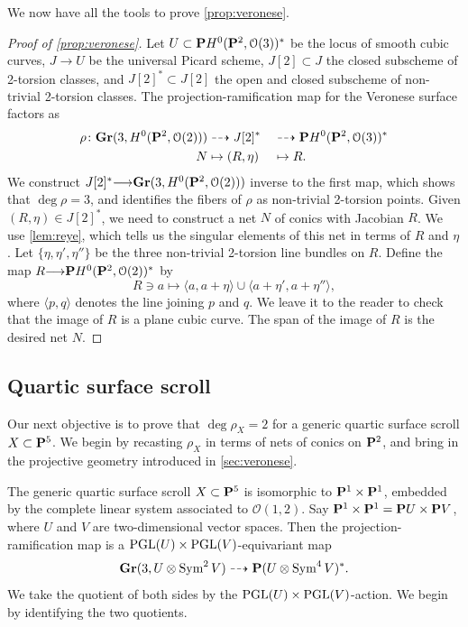 \documentclass[11pt,reqno]{amsart}
\theoremstyle{plain}
\theoremstyle{definition}
\theoremstyle{remark}
\numberwithin{equation}{section}
\renewcommand{\to}{{\longrightarrow}}
\numberwithin{equation}{section}
\renewcommand{\O}{\mathcal O}
\begin{document}
We now have all the tools to prove \autoref{prop:veronese}.
\begin{proof}[Proof of \autoref{prop:veronese}]
  Let $U \subset \P H^0(\P^2, \O(3))^*$ be the locus of smooth cubic curves, $J \to U$ be the universal Picard scheme, $J[2] \subset J$ the closed subscheme of 2-torsion classes, and $J[2]^* \subset J[2]$ the open and closed subscheme of non-trivial 2-torsion classes.
  The projection-ramification map for the Veronese surface factors as
  \begin{alignat*}{2}
    \rho \from \Gr(3, H^0(\P^2, \O(2))) &\dashrightarrow J[2]^* &&\dashrightarrow \P H^0(\P^2, \O(3))^*\\
    N &\mapsto (R, \eta) &&\mapsto R.
  \end{alignat*}
  We construct $J[2]^* \to \Gr(3,H^0(\P^2, \O(2)))$ inverse to the first map, which shows that $\deg \rho = 3$, and identifies the fibers of $\rho$ as non-trivial 2-torsion points.
  Given $(R, \eta) \in J[2]^*$, we need to construct a net $N$ of conics with Jacobian $R$.
  We use \autoref{lem:reye}, which tells us the singular elements of this net in terms of $R$ and $\eta$.
  Let $\{\eta, \eta', \eta''\}$ be the three non-trivial 2-torsion line bundles on $R$.
  Define the map $R \to \P H^0(\P^2, \O(2))^*$ by
  \[ R \ni a \mapsto \langle {a, a+\eta} \rangle \cup \langle {a+\eta', a+\eta''} \rangle ,\]
  where $\langle {p,q} \rangle$ denotes the line joining $p$ and $q$.
  We leave it to the reader to check that the image of $R$ is a plane cubic curve.
  The span of the image of $R$ is the desired net $N$.  
\end{proof}

\subsection{Quartic surface scroll}\label{sec:quartic_scroll}
Our next objective is to prove that $ \deg \rho_{X} = 2$ for a generic quartic surface scroll $X \subset \P^{5}$.
We begin by recasting $\rho_X$ in terms of nets of conics on $\P^2$, and bring in the projective geometry introduced in \autoref{sec:veronese}.

The generic quartic surface scroll $X \subset \P^5$ is isomorphic to $\P^1 \times \P^1$, embedded by the complete linear system associated to $\O(1,2)$.
Say $\P^1 \times \P^1 = \P U \times \P V$, where $U$ and $V$ are two-dimensional vector spaces.
Then the projection-ramification map is a $\PGL(U) \times \PGL(V)$-equivariant map
\[
  \Gr(3, U \otimes \Sym^2 V) \dashrightarrow \P(U \otimes \Sym^4 V)^*.
\]
We take the quotient of both sides by the $\PGL(U) \times \PGL(V)$-action.
We begin by identifying the two quotients.
\end{document}
